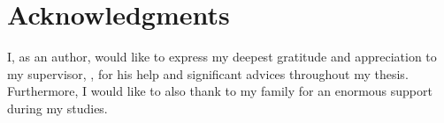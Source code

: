 
\vfill

\vglue 15cm
\section*{Acknowledgments}
I, as an author, would like to express my deepest gratitude and appreciation to my supervisor, \Supervisor, for his help and significant advices throughout my thesis. Furthermore, I would like to also thank to my family for an enormous support during my studies.